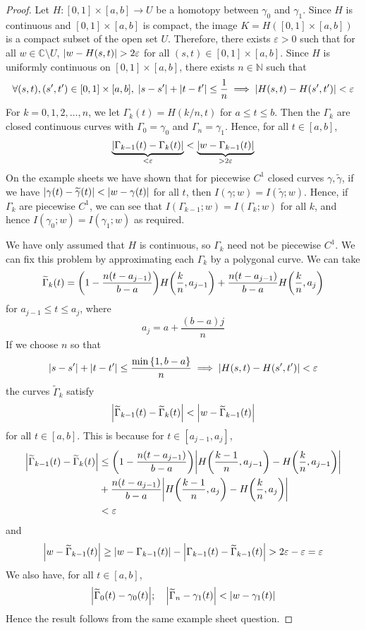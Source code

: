 \begin{proof}
	Let \( H \colon [0,1] \times [a,b] \to U \) be a homotopy between \( \gamma_0 \) and \( \gamma_1 \).
	Since \( H \) is continuous and \( [0,1] \times [a,b] \) is compact, the image \( K = H([0,1] \times [a,b]) \) is a compact subset of the open set \( U \).
	Therefore, there exists \( \varepsilon > 0 \) such that for all \( w \in \mathbb C \setminus U \), \( \abs{w - H(s,t)} > 2\varepsilon \) for all \( (s,t) \in [0,1] \times [a,b] \).
	Since \( H \) is uniformly continuous on \( [0,1] \times [a,b] \), there exists \( n \in \mathbb N \) such that
	\[ \forall (s,t),(s',t') \in [0,1] \times [a,b],\; \abs{s-s'} + \abs{t-t'} \leq \frac{1}{n} \implies \abs{H(s,t) - H(s',t')} < \varepsilon \]
	For \( k = 0,1,2,\dots,n \), we let \( \Gamma_k(t) = H(k/n,t) \) for \( a \leq t \leq b \).
	Then the \( \Gamma_k \) are closed continuous curves with \( \Gamma_0 = \gamma_0 \) and \( \Gamma_n = \gamma_1 \).
	Hence, for all \( t \in [a,b] \),
	\[ \underbrace{\abs{\Gamma_{k-1}(t) - \Gamma_k(t)}}_{< \varepsilon} < \underbrace{\abs{w - \Gamma_{k-1}(t)}}_{> 2 \varepsilon} \]
	On the example sheets we have shown that for piecewise \( C^1 \) closed curves \( \gamma, \widetilde \gamma \), if we have \( \abs{\gamma(t) - \widetilde \gamma(t)} < \abs{w - \gamma(t)} \) for all \( t \), then \( I(\gamma;w) = I(\widetilde \gamma;w) \).
	Hence, if \( \Gamma_k \) are piecewise \( C^1 \), we can see that \( I(\Gamma_{k-1};w) = I(\Gamma_k;w) \) for all \( k \), and hence \( I(\gamma_0;w) = I(\gamma_1;w) \) as required.

	We have only assumed that \( H \) is continuous, so \( \Gamma_k \) need not be piecewise \( C^1 \).
	We can fix this problem by approximating each \( \Gamma_k \) by a polygonal curve.
	We can take
	\[ \widetilde \Gamma_k(t) = \qty(1 - \frac{n(t-a_{j-1})}{b-a}) H\qty(\frac{k}{n},a_{j-1}) + \frac{n(t-a_{j-1})}{b-a} H\qty(\frac{k}{n}, a_j) \]
	for \( a_{j-1} \leq t \leq a_j \), where
	\[ a_j = a + \frac{(b-a)j}{n} \]
	If we choose \( n \) so that
	\[ \abs{s - s'} + \abs{t - t'} \leq \frac{\min\qty{1,b-a}}{n} \implies \abs{H(s,t) - H(s',t')} < \varepsilon \]
	the curves \( \widetilde \Gamma_k \) satisfy
	\[ \abs{\widetilde \Gamma_{k-1}(t) - \widetilde \Gamma_k(t)} < \abs{w - \widetilde \Gamma_{k-1}(t)} \]
	for all \( t \in [a,b] \).
	This is because for \( t \in [a_{j-1}, a_j] \),
	\begin{align*}
		\abs{\widetilde \Gamma_{k-1}(t) - \widetilde \Gamma_k(t)} &\leq \qty(1 - \frac{n(t-a_{j-1})}{b-a}) \abs{H\qty(\frac{k-1}{n}, a_{j-1}) - H\qty(\frac{k}{n}, a_{j-1})} \\
		&+ \frac{n(t-a_{j-1})}{b-a} \abs{ H\qty(\frac{k-1}{n},a_j) - H\qty(\frac{k}{n},a_j) } \\
		&< \varepsilon
	\end{align*}
	and
	\[ \abs{w-\widetilde \Gamma_{k-1}(t)} \geq \abs{w - \Gamma_{k-1}(t)} - \abs{\Gamma_{k-1}(t) - \widetilde \Gamma_{k-1}(t)} > 2\varepsilon - \varepsilon = \varepsilon \]
	We also have, for all \( t \in [a,b] \),
	\[ \abs{\widetilde \Gamma_0(t) - \gamma_0(t)};\quad \abs{\widetilde \Gamma_n - \gamma_1(t)} < \abs{w - \gamma_1(t)} \]
	Hence the result follows from the same example sheet question.
\end{proof}
